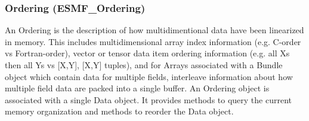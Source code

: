 \subsubsection{Ordering (ESMF\_Ordering)}
\label{sec:ordering} 
An Ordering is the description of how multidimentional data have been
linearized in memory.  This includes multidimensional array index information (e.g. C-order
vs Fortran-order), vector or tensor data item ordering information (e.g. all Xs then all
Ys vs [X,Y], [X,Y] tuples), and for Arrays associated with a Bundle object which contain
data for multiple fields, interleave information about how multiple field data are 
packed into a single buffer.
An Ordering object is associated with a single Data object.  It provides
methods to query the current memory organization and methods to reorder the Data object.

